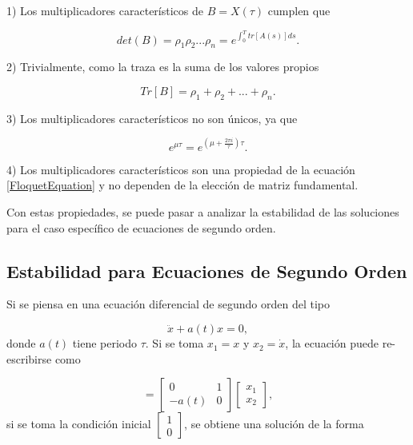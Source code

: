 \documentclass[a4paper,10pt]{report}
\begin{document}
1) Los multiplicadores característicos de $B=X(\tau)$ cumplen que

\begin{equation}
det(B) = \rho_1 \rho_2 ... \rho_n = e^{\int_0^T tr[A(s)]ds}.
\end{equation}

2) Trivialmente, como la traza es la suma de los valores propios

\begin{equation}
Tr[B] = \rho_1 + \rho_2 + ... + \rho_n.
\end{equation}

3) Los multiplicadores característicos no son únicos, ya que

\begin{equation}
e^{\mu \tau} = e^{(\mu  +\frac{2\pi i}{\tau} )\tau}.
\end{equation}

4) Los multiplicadores característicos son una propiedad de la ecuación \eqref{FloquetEquation} y no dependen de la elección de matriz fundamental.

Con estas propiedades, se puede pasar a analizar la estabilidad de las soluciones para el caso específico de ecuaciones de segundo orden.

\subsection{Estabilidad para Ecuaciones de Segundo Orden}\label{EstabilidadSO}

Si se piensa en una ecuación diferencial de segundo orden del tipo

\begin{equation}
\ddot{x} + a(t)x= 0,
\end{equation} donde $a(t)$ tiene periodo $\tau$. Si se toma $x_1 = x$ y $x_2 = \dot{x}$, la ecuación puede re-escribirse como

\begin{equation}
[\begin{array}{c}
\dot{x_1} \\
\dot{x_2}
\end{array}] = [\begin{array}{cc}
0 & 1 \\
-a(t) & 0
\end{array}][\begin{array}{c} 
x_1 \\ 
x_2

\end{array}],
\end{equation} si se toma la condición inicial $[\begin{array}{c} 1 \\ 0 \end{array}]$, se obtiene una solución de la forma
\end{document}
